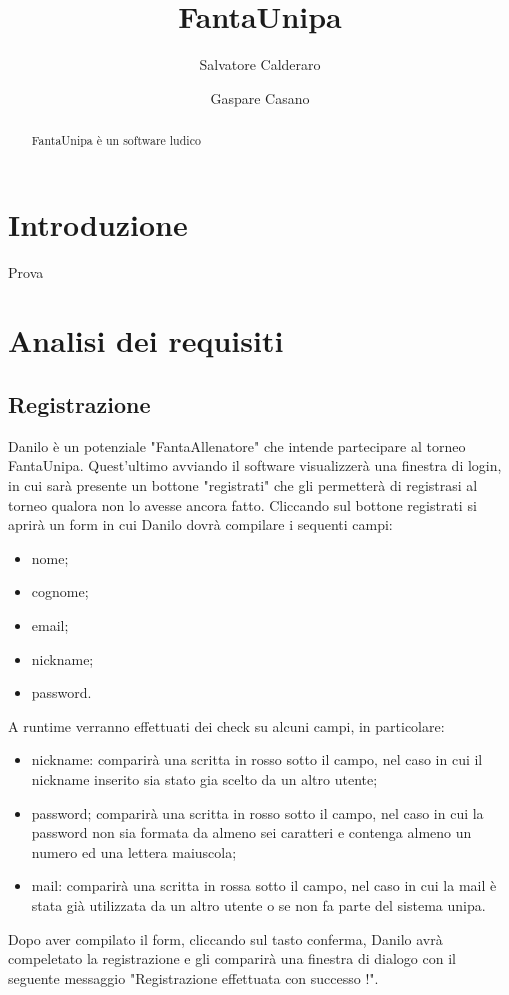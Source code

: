 \documentclass[12pt,a4paper]{article}
\title{FantaUnipa}
\author{Salvatore Calderaro \and Gaspare Casano}
\begin{document}
\maketitle
\newpage
\tableofcontents
\newpage
\begin{abstract}
FantaUnipa è un software ludico 
\end{abstract}
\newpage
\section{Introduzione}
Prova
\section{Analisi dei requisiti}
\subsection{Registrazione}
Danilo è un potenziale "FantaAllenatore" che intende partecipare al torneo FantaUnipa. Quest'ultimo avviando il software visualizzerà una finestra di login, in cui sarà presente  un bottone "registrati" che gli permetterà di registrasi al torneo qualora non lo avesse ancora fatto. Cliccando sul bottone registrati si aprirà un form in cui Danilo dovrà compilare i sequenti campi:
\begin{itemize}
\item nome;
\item cognome;
\item email;
\item nickname;
\item password.
\end{itemize}
A runtime verranno effettuati dei check su alcuni campi, in particolare:
\begin{itemize}
\item nickname: comparirà una scritta in rosso sotto il campo, nel caso in cui il nickname inserito sia stato gia scelto da un altro utente;
\item password; comparirà una scritta in rosso sotto il campo, nel caso in cui la password non sia formata da almeno sei caratteri e contenga almeno un numero ed una lettera maiuscola;
\item mail: comparirà una scritta in rossa sotto il campo, nel caso in cui la mail è stata già utilizzata da un altro utente o se non fa parte del sistema unipa.
\end{itemize}
Dopo aver compilato il form, cliccando sul tasto conferma, Danilo avrà compeletato la registrazione e gli comparirà una finestra di dialogo con il seguente messaggio "Registrazione effettuata con successo !".
\end{document}
